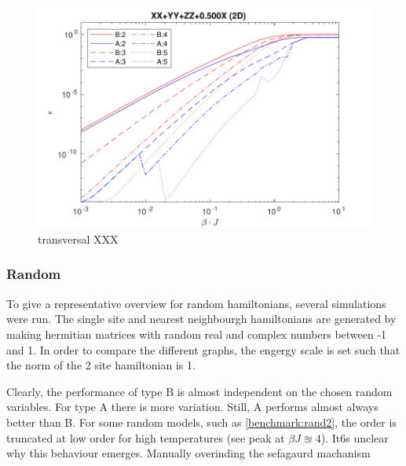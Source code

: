 \begin{figure}[H]
    \center
    \includegraphics[width=\textwidth]{Figuren/benchmarking/t_heis_XXX.pdf}
    \caption{transversal XXX}
    \label{fig:benchmark:tHeisenberg}
\end{figure}





\subsubsection{Random}

To give a representative overview for random hamiltonians, several simulations were run. The single site and nearest neighbourgh hamiltonians are generated by making hermitian matrices with random real and complex numbers between -1 and 1. In order to compare the different graphs, the engergy scale is set such that the norm of the 2 site hamiltonian is 1.


Clearly, the performance of type B is almost independent on the chosen random variables. For type A there is more variation. Still, A performs almost always better than B. For some random models, such as \cref{benchmark:rand2}, the order is truncated at low order for high temperatures (see peak at $\beta J \approxeq 4$). It6s unclear why this behaviour emerges. Manually overinding the sefagaurd machanism





